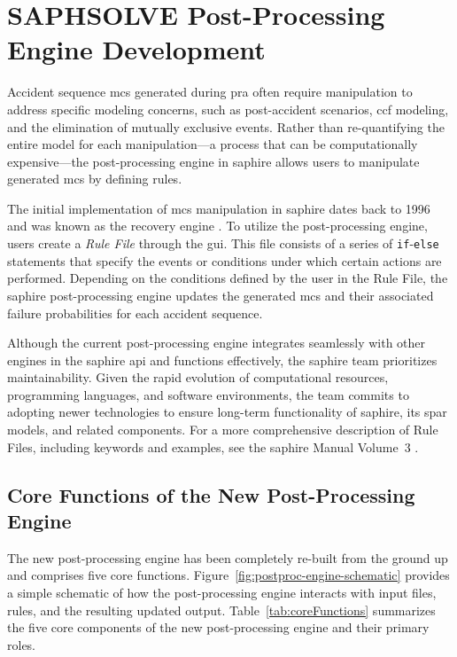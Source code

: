 \section{SAPHSOLVE Post-Processing Engine Development}
\label{sec:saphsolve-devel}

Accident sequence \acrshort{mcs} generated during \acrshort{pra} often require manipulation to address specific modeling concerns, such as post-accident scenarios, \acrshort{ccf} modeling, and the elimination of mutually exclusive events. Rather than re-quantifying the entire model for each manipulation---a process that can be computationally expensive---the post-processing engine in \acrshort{saphire} allows users to manipulate generated \acrshort{mcs} by defining rules.

The initial implementation of \acrshort{mcs} manipulation in \acrshort{saphire} dates back to 1996 and was known as the recovery engine \cite{Smith1996SAPHIRE}. To utilize the post-processing engine, users create a \emph{Rule File} through the \acrshort{gui}. This file consists of a series of \texttt{if}-\texttt{else} statements that specify the events or conditions under which certain actions are performed. Depending on the conditions defined by the user in the Rule File, the \acrshort{saphire} post-processing engine updates the generated \acrshort{mcs} and their associated failure probabilities for each accident sequence.

Although the current post-processing engine integrates seamlessly with other engines in the \acrshort{saphire} \acrshort{api} and functions effectively, the \acrshort{saphire} team prioritizes maintainability. Given the rapid evolution of computational resources, programming languages, and software environments, the team commits to adopting newer technologies to ensure long-term functionality of \acrshort{saphire}, its \acrfull{spar} models, and related components. For a more comprehensive description of Rule Files, including keywords and examples, see the \acrshort{saphire} Manual Volume~3 \cite{saphire_manual}.

\subsection{Core Functions of the New Post-Processing Engine}
\label{sec:core-functions}

The new post-processing engine has been completely re-built from the ground up and comprises five core functions. Figure~\ref{fig:postproc-engine-schematic} provides a simple schematic of how the post-processing engine interacts with input files, rules, and the resulting updated output. Table~\ref{tab:coreFunctions} summarizes the five core components of the new post-processing engine and their primary roles. 

